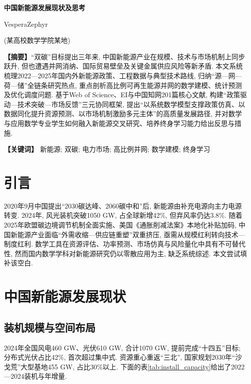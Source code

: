 \documentclass[a4paper,11pt,AutoFakeBold]{article}
\begin{document}
\begin{center}
    {\heiti \textbf{中国新能源发展现状及思考}}
    
    \vspace{1em}
    
    {\songti VesperaZephyr}
    
    \vspace{0.5em}
    
    {\songti (某高校数学学院\quad 某地)}
\end{center}

\vspace{1em}
\noindent 
\hangindent=1.7cm %
\textbf{【摘\phantom{要}要】}“双碳”目标提出三年来, 中国新能源产业在规模、技术与市场机制上同步跃升, 但也遭遇并网消纳、国际贸易壁垒及关键金属供应风险等新矛盾. 本文系统梳理2022—2025年国内外新能源政策、工程数据与典型技术路线, 归纳“源—网—荷—储”全链条研究热点, 重点剖析高比例可再生能源并网的数学建模、统计预测及优化调度问题. 基于Web of Science、EI与中国知网201篇核心文献, 构建“政策驱动—技术突破—市场反馈”三元协同框架, 提出“以系统数学模型支撑政策仿真、以数据同化提升资源预测、以市场机制激励多元主体”的高质量发展路径, 并对数学与应用数学专业学生如何融入新能源交叉研究、培养终身学习能力给出反思与措施. 
\vspace{1em}

\noindent
{\songti \textbf{【关键词】}}
{\songti 
新能源; 双碳; 电力市场; 高比例并网; 数学建模; 终身学习
}
\vspace{1em}

\setcounter{section}{-1} 
\section{引言}
  2020年9月中国提出“2030碳达峰、2060碳中和”后, 新能源由补充电源向主力电源转变. 2024年, 风光装机突破1050 GW, 占全球新增42\%, 但弃风率仍达3.8\%\cite{ref1}. 随着2025年欧盟碳边境调节机制全面实施、美国《通胀削减法案》本地化补贴加码, 中国新能源产业面临“外需收缩—供应链重塑”双重挤压, 亟需从规模红利转向技术—制度红利. 数学工具在资源评估、功率预测、市场仿真与风险量化中具有不可替代性, 然而国内数学学科对新能源研究仍以零散应用为主, 缺乏系统综述. 本文尝试填补该空白. 

\section{中国新能源发展现状}
\subsection{装机规模与空间布局}
2024年全国风电460 GW、光伏610 GW, 合计1070 GW, 提前完成“十四五”目标; 分布式光伏占比42\%, 首次超过集中式\cite{ref1}. 资源重心重返“三北”, 国家规划2030年“沙戈荒”大型基地455 GW, 占比30\%以上\cite{ref2}. 下面的表\ref{tab:install_capacity}给出了2022—2024装机与年增量. 
\end{document}
